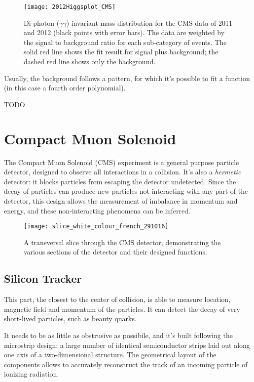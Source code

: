 \begin{figure}
	\centerline{
		\texttt{[image: 2012Higgsplot\_CMS]}}
	\caption{Di-photon ($\gamma\gamma$) invariant mass distribution for the CMS data of 2011 and 2012 (black points with error bars). The data are weighted by the signal to background ratio for each sub-category of events. The solid red line shows the fit result for signal plus background; the dashed red line shows only the background. \cite{Collaboration:1459463}}
\end{figure}


Usually, the background follows a pattern, for which it's possible to fit a function (in this case a fourth order polynomial).

TODO


\section{Compact Muon Solenoid}

The Compact Muon Solenoid (CMS) experiment is a general purpose particle detector, designed to observe all interactions in a collision. It's also a \textit{hermetic} detector: it blocks particles from escaping the detector undetected. Since the decay of particles can produce new particles not interacting with any part of the detector, this design allows the measurement of imbalance in momentum and energy, and these non-interacting phenomena can be inferred.

\begin{figure}
	\centerline{
		\texttt{[image: slice\_white\_colour\_french\_291016]}}
	\caption{A transversal slice through the CMS detector, demonstrating the various sections of the detector
		and their designed functions. \cite{Barney:2628641}}
	\label{fig:cms2}
\end{figure}

\subsection{Silicon Tracker}

This part, the closest to the center of collision, is able to measure location, magnetic field and momentum of the particles. It can detect the decay of very short-lived particles, such as beauty quarks.

It needs to be as little as obstrusive as possibile, and it's built following the microstrip design: a large number of identical semiconductor strips laid out along one axis of a two-dimensional structure. The geometrical layout of the components allows to accurately reconstruct the track of an incoming particle of ionizing radiation.

